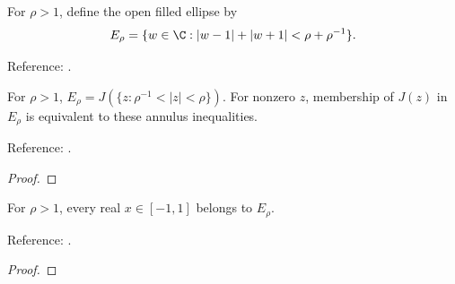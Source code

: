 \begin{definition}
\label{def:ellipse}
\leanok
For $\rho>1$, define the open filled ellipse by
\[E_\rho=\{w\in\C:|w-1|+|w+1|<\rho+\rho^{-1}\}.\]

Reference: \cite[Chapter 8]{atap}.
\end{definition}

\begin{theorem}
\label{thm:ellipse-annulus}
\leanok
For $\rho>1$, $E_\rho=J(\{z:\rho^{-1}<|z|<\rho\})$.
For nonzero $z$, membership of $J(z)$ in $E_\rho$ is equivalent to these
annulus inequalities.

Reference: \cite[Chapter 8]{atap}.
\end{theorem}
\begin{proof}
\leanok
\end{proof}

\begin{theorem}
\label{thm:ellipse-interval}
\leanok
For $\rho>1$, every real $x\in[-1,1]$ belongs to $E_\rho$.

Reference: \cite[Chapter 8]{atap}.
\end{theorem}
\begin{proof}
\leanok
\end{proof}


